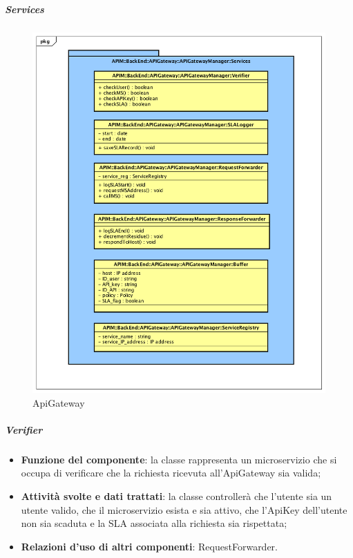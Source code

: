 \subparagraph{Services}
\begin{figure}[!htbp]
	\centering
	\includegraphics[scale=0.45]{UML/DiagrammiPackage/ApiGatewayManagerServices.png}
	\caption{ApiGateway}
\end{figure}
\FloatBarrier

\subparagraph{Verifier}
\begin{itemize}
	\item \textbf{Funzione del componente}: la classe rappresenta un microservizio che si occupa di verificare che la richiesta ricevuta all'ApiGateway sia valida;
	\item \textbf{Attivit\`{a} svolte e dati trattati}: la classe controller\`{a} che l'utente sia un utente valido, che il microservizio esista e sia attivo, che l'ApiKey dell'utente non sia scaduta e la SLA associata alla richiesta sia rispettata;
	\item \textbf{Relazioni d'uso di altri componenti}: RequestForwarder.

\end{itemize}


